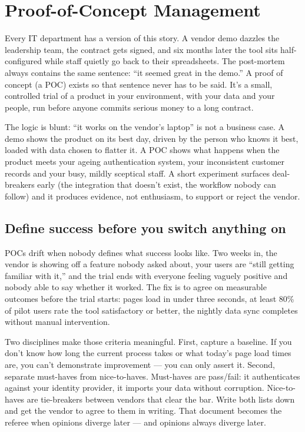 \section{Proof-of-Concept Management}
Every IT department has a version of this story. A vendor demo dazzles the leadership team, the contract gets signed, and six months later the tool sits half-configured while staff quietly go back to their spreadsheets. The post-mortem always contains the same sentence: ``it seemed great in the demo.'' A proof of concept (a POC) exists so that sentence never has to be said. It's a small, controlled trial of a product in your environment, with your data and your people, run before anyone commits serious money to a long contract.


The logic is blunt: ``it works on the vendor's laptop'' is not a business case. A demo shows the product on its best day, driven by the person who knows it best, loaded with data chosen to flatter it. A POC shows what happens when the product meets your ageing authentication system, your inconsistent customer records and your busy, mildly sceptical staff. A short experiment surfaces deal-breakers early (the integration that doesn't exist, the workflow nobody can follow) and it produces evidence, not enthusiasm, to support or reject the vendor.



\subsection{Define success before you switch anything on}


POCs drift when nobody defines what success looks like. Two weeks in, the vendor is showing off a feature nobody asked about, your users are ``still getting familiar with it,'' and the trial ends with everyone feeling vaguely positive and nobody able to say whether it worked. The fix is to agree on measurable outcomes before the trial starts: pages load in under three seconds, at least 80\% of pilot users rate the tool satisfactory or better, the nightly data sync completes without manual intervention.


Two disciplines make those criteria meaningful. First, capture a baseline. If you don't know how long the current process takes or what today's page load times are, you can't demonstrate improvement — you can only assert it. Second, separate must-haves from nice-to-haves. Must-haves are pass/fail: it authenticates against your identity provider, it imports your data without corruption. Nice-to-haves are tie-breakers between vendors that clear the bar. Write both lists down and get the vendor to agree to them in writing. That document becomes the referee when opinions diverge later — and opinions always diverge later.



